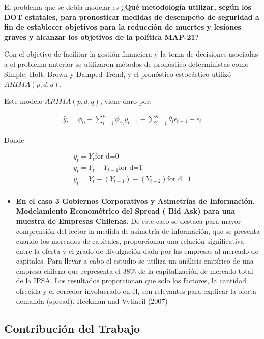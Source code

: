 \documentclass[
  british,
]{article}
\providecommand{\tightlist}{%
  \setlength{\itemsep}{0pt}\setlength{\parskip}{0pt}}
\begin{document}
El problema que se debía modelar es \textbf{¿Qué metodología utilizar,
según los DOT estatales, para pronosticar medidas de desempeño de
seguridad a fin de establecer objetivos para la reducción de muertes y
lesiones graves y alcanzar los objetivos de la política MAP-21?}

Con el objetivo de facilitar la gestión financiera y la toma de
decisiones asociadas a el problema anterior se utilizaron métodos de
pronóstico deterministas como Simple, Holt, Brown y Damped Trend, y el
pronóstico estocástico utilizó \(ARIMA(p, d, q)\).

Este modelo \(ARIMA(p, d, q)\), viene daro por:

\begin{eqnarray}
\hat{y}_{t}=\phi_{0}+\sum_{i=1}^{p}\phi_\phi_{i}y_{t-1}-\sum_{i=1}^{q}\theta_{i}\epsilon_{t-1}+\epsilon_{t}
\end{eqnarray}

Donde

\begin{eqnarray*}
    y_{t}=Y_{t} \mbox{for d=0}\\
    y_{t}= Y_{t}-Y_{t-1}\mbox{for d=1}\\
    y_{t}= Y_{t}-(Y_{t-1})-(Y_{t-2})\mbox{for d=1}\\    
\end{eqnarray*}

\begin{itemize}
\tightlist
\item
  \textbf{En el caso 3 Gobiernos Corporativos y Asimetrías de
  Información. Modelamiento Econométrico del Spread ( Bid Ask) para una
  muestra de Empresas Chilenas.} De este caso se destaca para mayor
  comprensión del lector la medida de asimetría de información, que se
  presenta cuando los mercados de capitales, proporcionan una relación
  significativa entre la oferta y el grado de divulgación dada por las
  empresas al mercado de capitales. Para llevar a cabo el estudio se
  utiliza un análisis empírico de una empresa chilena que representa el
  38\% de la capitalización de mercado total de la IPSA. Los resultados
  proporcionan que solo los factores, la cantidad ofrecida y el corredor
  involucrado en él, son relevantes para explicar la oferta-demanda
  (spread). Heckman and Vytlacil (2007)
\end{itemize}

\hypertarget{contribuciuxf3n-del-trabajo}{%
\subsection{Contribución del
Trabajo}\label{contribuciuxf3n-del-trabajo}}
\end{document}
